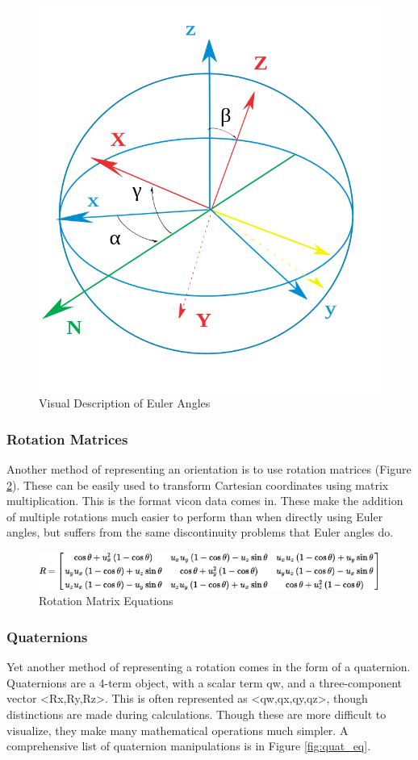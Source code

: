 \documentclass[a4paper]{article}
\begin{document}
\begin{figure}[h]
  \centering
    \includegraphics[width=.5\textwidth]{euler_im.png}
  \caption{Visual Description of Euler Angles\label{fig:euler_im}}
\end{figure}

\subsubsection{Rotation Matrices}

	Another method of representing an orientation is to use rotation matrices (Figure \ref{fig:rot_mat}). These can be easily used to transform Cartesian coordinates using matrix multiplication. This is the format vicon data comes in. These make the addition of multiple rotations much easier to perform than when directly using Euler angles, but suffers from the same discontinuity problems that Euler angles do.
\begin{figure}[h]
  \centering
    \includegraphics[width=1\textwidth]{rot_mat.png}
  \caption{Rotation Matrix Equations\label{fig:rot_mat}}
\end{figure}

\subsubsection{Quaternions}

Yet another method of representing a rotation comes in the form of a quaternion. Quaternions are a 4-term object, with a scalar term qw, and a three-component vector <Rx,Ry,Rz>. This is often represented as <qw,qx,qy,qz>, though distinctions are made during calculations. Though these are more difficult to visualize, they make many mathematical operations much simpler. A comprehensive list of quaternion manipulations is in Figure \ref{fig:quat_eq}.
\end{document}
